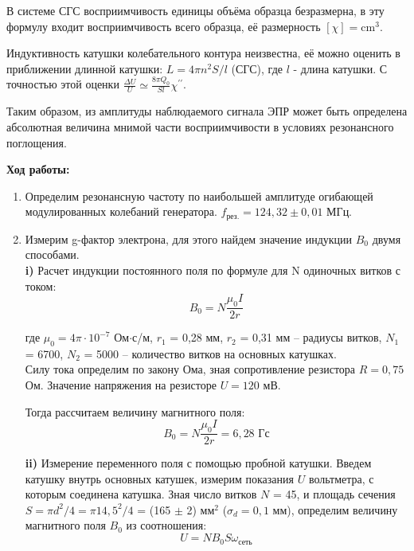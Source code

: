 \documentclass[a4paper, 12pt]{article}%
\begin{document}
	В системе СГС восприимчивость единицы объёма образца безразмерна, в эту формулу входит восприимчивость всего образца, её размерность $[\chi]=\mathrm{cm}^3$.
	
	Индуктивность катушки колебательного контура неизвестна, её можно оценить в приближении длинной катушки: $L=4 \pi n^2 S / l$ (СГС), где $l$ - длина катушки. С точностью этой оценки $\frac{\Delta U}{U} \simeq \frac{8 \pi Q_0}{S l} \chi^{\prime \prime}$.
	
	Таким образом, из амплитуды наблюдаемого сигнала ЭПР может быть определена абсолютная величина мнимой части восприимчивости в условиях резонансного поглощения.
	
	\newpage 
	
	\textbf{Ход работы: }\\
	
	\begin{enumerate}
		
		\item Определим резонансную частоту по наибольшей амплитуде огибающей модулированных колебаний генератора. $f_{\text{рез.}} = 124,32 \pm 0,01$ МГц.
		
		\item Измерим g-фактор электрона, для этого найдем значение индукции $B_0$ двумя способами. \\
		
		\textbf{i)} Расчет индукции постоянного поля по формуле для N одиночных витков с током: 
		$$B_0 = N\frac{\mu_0 I}{2r} $$
		
		где $\mu_0 = 4\pi \cdot 10^{-7}$ Ом$\cdot$с/м, $r_1$ = 0,28 мм,  $r_2$ = 0,31 мм -- радиусы витков, $N_1$ = 6700, $N_2$ = 5000 -- количество витков на основных катушках.\\
		Силу тока определим по закону Ома, зная сопротивление резистора $R = 0,75$ Ом. Значение напряжения на резисторе $U = 120$ мВ.
		
		Тогда рассчитаем величину магнитного поля:
		$$ B_0 = N\frac{\mu_0 I}{2r} = 6,28 \text{ Гс}$$
	
				
		\textbf{ii)} Измерение переменного поля с помощью пробной катушки. Введем катушку внутрь основных катушек, измерим показания $U$ вольтметра, с которым соединена катушка. Зная число витков $N$ = 45, и площадь сечения $S = \pi d^2/4 = \pi 14,5^2 / 4 $ = (165 $\pm$ 2) мм$^2$ ($\sigma_d = 0,1$ мм), определим величину магнитного поля $B_0$ из соотношения:
		$$ U = NB_0S\omega_{\text{сеть}} $$
		

\end{enumerate}
\end{document}
